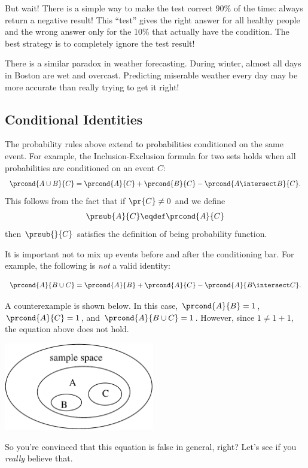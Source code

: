 But wait!  There is a simple way to make the test correct 90\% of the
time: always return a negative result!  This ``test'' gives the right
answer for all healthy people and the wrong answer only for the 10\%
that actually have the condition.  The best strategy is to completely
ignore the test result!

There is a similar paradox in weather forecasting.  During winter,
almost all days in Boston are wet and overcast.  Predicting miserable
weather every day may be more accurate than really trying to get it
right!

\subsection{Conditional Identities}\label{cond_ident_subsec}

The probability rules above extend to probabilities conditioned on the
same event.  For example, the Inclusion-Exclusion formula for two sets
holds when all probabilities are conditioned on an event $C$:
\[
\prcond{A \cup B}{C} = \prcond{A}{C} + \prcond{B}{C} - \prcond{A \intersect B}{C}.
\]
This follows from the fact that if $\pr{C} \neq 0$ and we define
\[
\prsub{A}{C} \eqdef \prcond{A}{C}
\]
then $\prsub{}{C}$ satisfies the definition of being probability function.

It is important not to mix up events before and after the conditioning bar.
For example, the following is \textit{not} a valid identity:
%
\begin{falseclm*}
\begin{equation}\label{LN12:fc}
\prcond{A}{B \cup C} = \prcond{A}{B} + \prcond{A}{C} - \prcond{A}{B \intersect C}.
\end{equation}
\end{falseclm*}

A counterexample is shown below.  In this case, $\prcond{A}{B} = 1$,
$\prcond{A}{C} = 1$, and $\prcond{A}{B \cup C} = 1$.  However, since
$1 \neq 1 + 1$, the equation above does not hold.
%
\begin{center}
\includegraphics[height=1.5in]{figures/cx19}
\end{center}
%
So you're convinced that this equation is false in general, right?
Let's see if you \textit{really} believe that.

